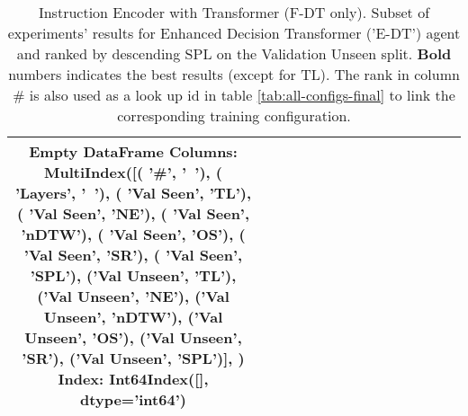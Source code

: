 \begin{table}
\centering
\caption{\label{tab:e_dt_instruction_encoding_full}Instruction Encoder with Transformer (F-DT only). Subset of experiments' results for Enhanced Decision Transformer ('E-DT') agent and ranked by descending SPL on the Validation Unseen split. \textbf{Bold} numbers indicates the best results (except for TL). The rank in column \# is also used as a look up id in table \ref{tab:all-configs-final} to link the corresponding training configuration.}
\begin{tabular}{@{\hskip3pt}c@{\hskip3pt}c@{\hskip3pt}c@{\hskip3pt}c@{\hskip3pt}c@{\hskip3pt}c@{\hskip3pt}c@{\hskip3pt}c@{\hskip3pt}c@{\hskip3pt}c@{\hskip3pt}c@{\hskip3pt}c@{\hskip3pt}c@{\hskip3pt}c@{\hskip3pt}c}
\toprule
Empty DataFrame
Columns: MultiIndex([(        '\textbf{\#}',    '\textbf{~}'),
            (    '\textbf{Layers}',    '\textbf{~}'),
            (  '\textbf{Val Seen}',   '\textbf{TL}'),
            (  '\textbf{Val Seen}',   '\textbf{NE}'),
            (  '\textbf{Val Seen}', '\textbf{nDTW}'),
            (  '\textbf{Val Seen}',   '\textbf{OS}'),
            (  '\textbf{Val Seen}',   '\textbf{SR}'),
            (  '\textbf{Val Seen}',  '\textbf{SPL}'),
            ('\textbf{Val Unseen}',   '\textbf{TL}'),
            ('\textbf{Val Unseen}',   '\textbf{NE}'),
            ('\textbf{Val Unseen}', '\textbf{nDTW}'),
            ('\textbf{Val Unseen}',   '\textbf{OS}'),
            ('\textbf{Val Unseen}',   '\textbf{SR}'),
            ('\textbf{Val Unseen}',  '\textbf{SPL}')],
           )
Index: Int64Index([], dtype='int64') \\
\bottomrule
\end{tabular}
\end{table}
